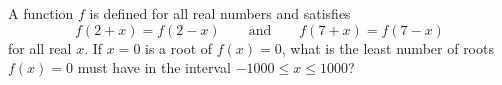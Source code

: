 A function $f$ is defined for all real numbers and satisfies \[f(2 + x) = f(2 - x)\qquad\text{and}\qquad f(7 + x) = f(7 - x)\]for all real $x$.  If $x = 0$ is a root of $f(x) = 0$, what is the least number of roots $f(x) = 0$ must have in the interval $-1000 \le x \le 1000$?